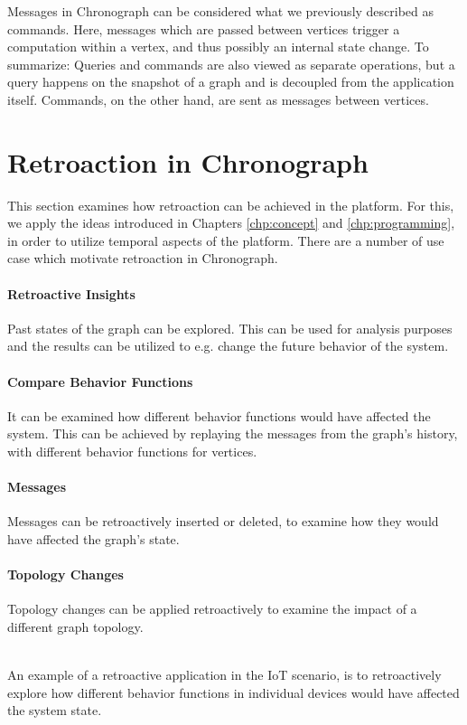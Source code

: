 Messages in Chronograph can be considered what we previously described as 
commands. Here, messages which are passed between vertices trigger a computation 
within a vertex, and thus possibly an internal state change. 
To summarize: Queries and commands are also viewed as separate operations, but a 
query happens on the snapshot of a graph and is decoupled from the application
itself. Commands, on the other hand, are sent as messages between vertices.

\section{Retroaction in Chronograph}
This section examines how retroaction can be achieved in the platform. For this, 
we apply the ideas introduced in Chapters \ref{chp:concept} and 
\ref{chp:programming}, in order to utilize temporal aspects of the platform. 
There are a number of use case which motivate retroaction in Chronograph. 

\paragraph{Retroactive Insights}
Past states of the graph can be explored. This can be used for analysis purposes
and the results can be utilized to e.g. change the future behavior of the system. 

\paragraph{Compare Behavior Functions}
It can be examined how different behavior functions would have affected the 
system. This can be achieved  by replaying the messages from the graph's 
history, with different behavior functions for vertices. 

\paragraph{Messages}
Messages can be retroactively inserted or deleted, to examine how they would 
have affected the graph's state.

\paragraph{Topology Changes}
Topology changes can be applied retroactively to examine the impact of a different 
graph topology.

\ \\
An example of a retroactive application in the IoT scenario, is to retroactively 
explore how different behavior functions in individual devices would have affected 
the system state.

